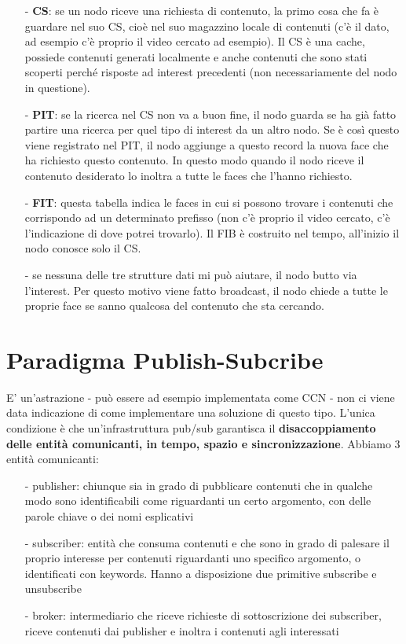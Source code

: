 \documentclass[12pt,italian]{report}
\begin{document}
\begin{itemize}
    \item [-] \textbf{CS}: se un nodo riceve una richiesta di contenuto, la primo cosa che fa è guardare nel suo CS, cioè nel suo magazzino locale di contenuti (c'è il dato, ad esempio c'è proprio il video cercato ad esempio). Il CS è una cache, possiede contenuti generati localmente e anche contenuti che sono stati scoperti perché risposte ad interest precedenti (non necessariamente del nodo in questione). 
    \item [-] \textbf{PIT}: se la ricerca nel CS non va a buon fine, il nodo guarda se ha già fatto partire una ricerca per quel tipo di interest da un altro nodo. Se è così questo viene registrato nel PIT, il nodo aggiunge a questo record la nuova face che ha richiesto questo contenuto. In questo modo quando il nodo riceve il contenuto desiderato lo inoltra a tutte le faces che l'hanno richiesto.
    \item [-] \textbf{FIT}: questa tabella indica le faces in cui si possono trovare i contenuti che corrispondo ad   un determinato prefisso (non c'è proprio il video cercato, c'è l'indicazione di dove potrei trovarlo). Il FIB è costruito nel tempo, all'inizio il nodo conosce solo il CS. 
    \item [-] se nessuna delle tre strutture dati mi può aiutare, il nodo butto via l'interest. Per questo motivo viene fatto broadcast, il nodo chiede a tutte le proprie face se sanno qualcosa del contenuto che sta cercando.
\end{itemize}

\section{Paradigma Publish-Subcribe}
\label{sec:PS}
E' un'astrazione - può essere ad esempio implementata come CCN - non ci viene data indicazione di come implementare una soluzione di questo tipo. L'unica condizione è che un'infrastruttura pub/sub garantisca il \textbf{disaccoppiamento delle entità comunicanti, in tempo, spazio e sincronizzazione}.
\bigbreak
\noindent Abbiamo 3 entità comunicanti: 
\begin{itemize}
    \item [-] publisher: chiunque sia in grado di pubblicare contenuti che in qualche modo sono identificabili come riguardanti un certo argomento, con delle parole chiave o dei nomi esplicativi
    \item [-] subscriber: entità che consuma contenuti e che sono in grado di palesare il proprio interesse per contenuti riguardanti uno specifico argomento, o identificati con keywords. Hanno a disposizione due primitive subscribe e unsubscribe
    \item [-] broker: intermediario che riceve richieste di sottoscrizione dei subscriber, riceve contenuti dai publisher e inoltra i contenuti agli interessati
\end{itemize}
\end{document}
